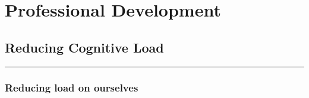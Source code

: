 \documentclass[
  letterpaper,
  DIV=11,
  numbers=noendperiod]{scrreprt}
\begin{document}
\part{Professional Development}

\hypertarget{reducing-cognitive-load}{%
\chapter{Reducing Cognitive Load}\label{reducing-cognitive-load}}

\begin{center}\rule{0.5\linewidth}{0.5pt}\end{center}

\hypertarget{reducing-load-on-ourselves}{%
\section*{\texorpdfstring{\textbf{Reducing load on
ourselves}}{Reducing load on ourselves}}\label{reducing-load-on-ourselves}}
\end{document}
